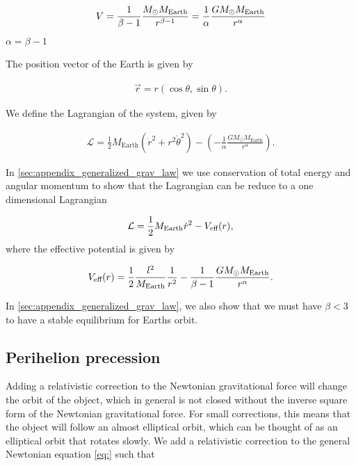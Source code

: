 \documentclass[../main.tex]{subfiles}
\begin{document}
\begin{align}
    V = \frac{1}{\beta-1}\frac{M_{\odot} M_{\textnormal{\text{Earth}}}}{r^{\beta-1}}=\frac{1}{\alpha}\frac{GM_{\odot} M_{\text{Earth}}}{r^{\alpha}}
\end{align} \ensuremath{\alpha = \beta - 1}

The position vector of the Earth is given by

\begin{align*}
    \vec{r}=r(\cos\theta,\sin\theta).
\end{align*}

We define the Lagrangian of the system, given by

\begin{align*}
    \mathcal{L}=\frac{1}{2}M_{\text{Earth}}(\dot{r}^2+r^2\dot{\theta}^2)-\left(-\frac{1}{\alpha}\frac{GM_{\odot} M_{\text{Earth}}}{r^{\alpha}}\right).
\end{align*}

In \cref{sec:appendix_generalized_grav_law} we use conservation of total energy and angular momentum to show that the Lagrangian can be reduce to a one dimensional Lagrangian

\begin{align*}
    \mathcal{L}=\frac{1}{2}M_{\text{Earth}}\dot{r}^2-V_{\textnormal{eff}}(r),
\end{align*} where the effective potential is given by

\begin{align*}
    V_{\textnormal{eff}}(r)=\frac{1}{2}\frac{l^2}{M_{\text{Earth}}}\frac{1}{r^2}-\frac{1}{\beta-1}\frac{GM_{\odot}M_{\text{Earth}}}{r^{\alpha}}.
\end{align*} 

In \cref{sec:appendix_generalized_grav_law}, we also show that we must have \ensuremath{\beta<3} to have a stable equilibrium for Earths orbit. 

\subsection{Perihelion precession}

Adding a relativistic correction to the Newtonian gravitational force will change the orbit of the object, which in general is not closed without the inverse square form of the Newtonian gravitational force. For small corrections, this means that the object will follow an almost elliptical orbit, which can be thought of as an elliptical orbit that rotates slowly. We add a relativistic correction to the general Newtonian equation \cref{eq:} such that
\end{document}
